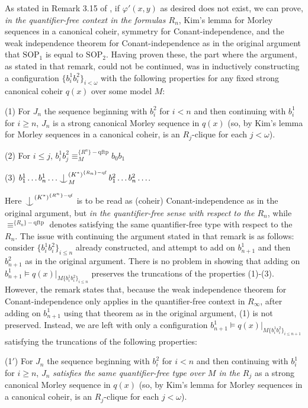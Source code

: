 \documentclass{article}
\theoremstyle{definition}
\theoremstyle{definition}
\theoremstyle{definition}
\def\Ind#1#2{#1\setbox0=\hbox{$#1x$}\kern\wd0\hbox to 0pt{\hss$#1\mid$\hss}
\lower.9\ht0\hbox to 0pt{\hss$#1\smile$\hss}\kern\wd0}
\def\ind{\mathop{\mathpalette\Ind{}}}
\begin{document}
    As stated in Remark 3.15 of \cite{mutchnik2023properties}, if $\varphi'(x, y)$ as desired does not exist, we can prove, \textit{in the quantifier-free context in the formulas $R_{n}$}, Kim’s
lemma for Morley sequences in a canonical coheir, symmetry for Conant-independence, and the weak
independence theorem for Conant-independence as in the original argument  that $\mathrm{SOP}_{1}$ is equal to $\mathrm{SOP}_{2}$. Having proven these, the part where the argument, as stated in that remark, could not be continued, was in inductively constructing a configuration $\{b^{1}_{i}b_{i}^{2}\}_{i < \omega}$ with the following properties for any fixed strong canonical coheir $q(x)$ over some model $M$:

(1) For $J_{n}$ the sequence beginning with $b_{i}^{2}$ for $i < n$ and then continuing with $b_{i}^{1}$ for $i \geq n$, $J_{n}$ is a strong canonical Morley sequence in $q(x)$ (so, by Kim’s
lemma for Morley sequences in a canonical coheir, is an $R_{j}$-clique for each $j < \omega$).

(2) For $i \leq j$, $b_{i}^{1} b_{j}^{2}\equiv^{\{R^{n}\} - \mathrm{qftp}}_{M}  b_{0}b_{1}$

(3) $b^{1}_{1} \ldots b^{1}_{n} \ldots \ind^{(K^{*})^{\{R_{n}\}-\mathrm{qf}}}_{M}b^{2}_{1} \ldots b^{2}_{n} \ldots$.

Here $\ind^{(K^{*})^{\{R^{n}\}-\mathrm{qf}}}$ is to be read as (coheir) Conant-independence as in the original argument, but \textit{in the quantifier-free sense with respect to the $R_{n}$}, while $\equiv^{\{R_{n}\} - \mathrm{qftp}}$ denotes satisfying the same quantifier-free type with respect to the $R_{n}$. The issue with continuing the argument stated in that remark is as follows: consider $\{b^{1}_{i}b_{i}^{2}\}_{i \leq n}$ already constructed, and attempt to add on $b^{1}_{n+1}$ and then $b^{2}_{n+1}$ as in the original argument. There is no problem in showing that adding on $b^{1}_{n+1} \models q(x)|_{M \{b^{1}_{i}b_{i}^{2}\}_{i \leq n} } $ preserves the truncations of the properties (1)-(3). However, the remark states that, because the weak independence theorem for Conant-independence only applies in the quantifier-free context in $R_{\infty}$, after adding on $b^{1}_{n+1}$ using that theorem as in the original argument, (1) is not preserved. Instead, we are left with only a configuration  $b^{1}_{n+1} \models q(x)|_{M \{b^{1}_{i}b_{i}^{2}\}_{i \leq n+1} } $ satisfying the truncations of the following properties:

(1$'$) For $J_{n}$ the sequence beginning with $b_{i}^{2}$ for $i < n$ and then continuing with $b_{i}^{1}$ for $i \geq n$, $J_{n}$ \textit{satisfies the same quantifier-free type over $M$ in the $R_{j}$} as a strong canonical Morley sequence in $q(x)$ (so, by Kim’s
lemma for Morley sequences in a canonical coheir, is an $R_{j}$-clique for each $j < \omega$).
\end{document}
